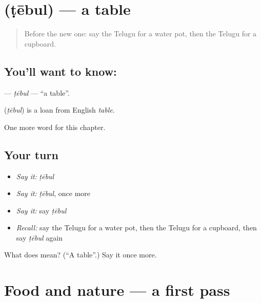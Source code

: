 \section[\texorpdfstring{\te{టేబుల్} (ṭēbul)}{టేబుల్ (ṭēbul)}]{ (ṭēbul) — a table}

\label{lesson:TE-C129-tebul}



\begin{quote}
Before the new one: say the Telugu for a water pot, then the Telugu for a cupboard.
\end{quote}

\subsection*{You'll want to know: }
\textbf{} — \emph{ṭēbul} — \textquotedblleft{}a table\textquotedblright{}.

\begin{cousinweb}
\textbf{} (\emph{ṭēbul}) is a loan from English \emph{table}.
\end{cousinweb}

\begin{grammarlens}[title={What you've built}]
One more word for this chapter.
\end{grammarlens}

\subsection*{Your turn}
\begin{itemize}
\raggedright
  \item \emph{Say it:} \emph{ṭēbul}
  \item \emph{Say it:} \emph{ṭēbul}, once more
  \item \emph{Say it:} say \emph{ṭēbul}
  \item \emph{Recall:} say the Telugu for a water pot, then the Telugu for a cupboard, then say \emph{ṭēbul} again
\end{itemize}

\begin{tcolorbox}[breakable,colback=teal!4,colframe=teal!35!black,title={Before you move on}]
What does  mean? (\textquotedblleft{}A table\textquotedblright{}.) Say it once more.
\end{tcolorbox}
\section[(dialogue)]{Food and nature — a first pass}

